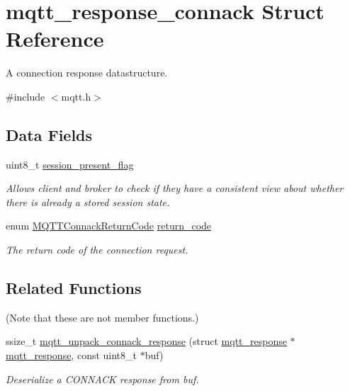 \hypertarget{structmqtt__response__connack}{}\section{mqtt\+\_\+response\+\_\+connack Struct Reference}
\label{structmqtt__response__connack}


A connection response datastructure.  




{\ttfamily \#include $<$mqtt.\+h$>$}

\subsection*{Data Fields}
\begin{DoxyCompactItemize}
\item 
uint8\+\_\+t \hyperlink{structmqtt__response__connack_a72011a82aebeb7f92160a9cfd32e8863}{session\+\_\+present\+\_\+flag}\hypertarget{structmqtt__response__connack_a72011a82aebeb7f92160a9cfd32e8863}{}\label{structmqtt__response__connack_a72011a82aebeb7f92160a9cfd32e8863}

\begin{DoxyCompactList}\small\item\em Allows client and broker to check if they have a consistent view about whether there is already a stored session state. \end{DoxyCompactList}\item 
enum \hyperlink{group__unpackers_ga07e480dfa5738e60c54ad0447ddb1a25}{M\+Q\+T\+T\+Connack\+Return\+Code} \hyperlink{structmqtt__response__connack_a5a78ad2b1a131655851e93d79e25a2d3}{return\+\_\+code}
\begin{DoxyCompactList}\small\item\em The return code of the connection request. \end{DoxyCompactList}\end{DoxyCompactItemize}
\subsection*{Related Functions}
(Note that these are not member functions.) \begin{DoxyCompactItemize}
\item 
ssize\+\_\+t \hyperlink{group__unpackers_gaa174fec8a214d65ee887b5b6c9b79d78}{mqtt\+\_\+unpack\+\_\+connack\+\_\+response} (struct \hyperlink{structmqtt__response}{mqtt\+\_\+response} $\ast$\hyperlink{structmqtt__response}{mqtt\+\_\+response}, const uint8\+\_\+t $\ast$buf)
\begin{DoxyCompactList}\small\item\em Deserialize a C\+O\+N\+N\+A\+CK response from {\ttfamily buf}. \end{DoxyCompactList}\end{DoxyCompactItemize}


